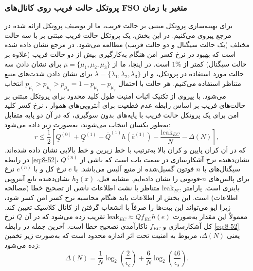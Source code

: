 \subsubsection{پروتکل حالت فریب روی کانال‌های FSO متغیر با زمان}
\label{subsec:8-3-2}
برای بهینه‌سازی پروتکل مبتنی بر حالت فریب، ما از توصیف پروتکل ارائه شده در مرجع \cite{8-49} پیروی می‌کنیم. در این بخش، یک پروتکل حالت فریب مبتنی بر  با سه حالت مختلف (یک حالت سیگنال و دو حالت فریب) مطالعه می‌شود. در مرجع \cite{8-50} نشان داده شده است که بهبود در نرخ کسر امن هنگام به‌کارگیری بیش از دو حالت فریب (علاوه بر حالت سیگنال) کمتر از $1\%$ است. در اینجا، ما از $\mu = \{\mu_1, \mu_2, \mu_3\}$ برای نشان دادن سه حالت مورد استفاده در پروتکل، و از $\lambda = \{\lambda_1, \lambda_2, \lambda_3\}$ برای نشان دادن شدت‌های منبع متناظر استفاده می‌کنیم. هر حالت با احتمال $p_{\mu_1} > p_{\mu_2} > p_{\mu_3} = 1 - p_{\mu_1} - p_{\mu_2}$ انتخاب می‌شود. با پیروی از تکنیک اثبات امنیت طول کلید محدود برای پروتکل مبتنی بر حالت‌های فریب بر اساس رابطه عدم قطعیت برای آنتروپی‌های هموار \cite{8-28, 8-29, 8-41, 8-51}، نرخ کسر کلید امن برای یک پروتکل حالت فریب با پایه‌های بدون سوگیری، که در آن دو پایه متقابل به‌طور یکسان انتخاب می‌شوند، به‌صورت زیر داده می‌شود:
\begin{equation}
	r \leq \frac{1}{2} \left[ \underline{Q}^{(0)} + \underline{Q}^{(1)} - \overline{Q}^{(1)} h(\bar{e}^{(1)}) - \frac{\text{leak}_{EC}}{N} - \Delta(N) \right],
	\label{eq:8-52}
\end{equation}
که در آن کران پایین و کران بالا به‌ترتیب با خط زیرین و خط بالایی نشان داده شده‌اند. در رابطه \eqref{eq:8-52}، $Q^{(n)}$ نشان‌دهنده نرخ آشکارسازی در سمت باب است که ناشی از سیگنال‌های با $n$ فوتون گسیل‌شده از منبع آلیس می‌باشد. با $e$ نرخ کل  و با $e^{(n)}$ نرخ  برای پالس‌های $n$-فوتونی را نشان داده‌ایم. مشابه قبل، $h_2(x)$ نشان‌دهنده تابع آنتروپی باینری است. پارامتر $\text{leak}_{EC}$ متناظر با نشت اطلاعات ناشی از تصحیح خطا (مصالحه اطلاعات) است. این بخش از اطلاعات باید هنگام محاسبه نرخ کسر امن کسر شود، زیرا ایو می‌تواند این بیت‌ها را صرفاً با انشعاب گرفتن از کانال کلاسیک تعیین کند. معمولاً این مقدار به‌صورت $\text{leak}_{EC} \approx Q f_{EC} h(e)$ تقریب زده می‌شود که در آن $Q$ نرخ کل آشکارسازی و $f_{EC}$ ناکارآمدی تصحیح خطا است. آخرین جمله در رابطه \eqref{eq:8-52} یعنی $\Delta(N)$، مربوط به امنیت تحت اثر اندازه محدود است که به‌صورت زیر تخمین زده می‌شود:
\begin{equation}
	\Delta(N) = \frac{1}{N} \log_2 \left( \frac{2}{\epsilon_c} \right) + \frac{6}{N} \log_2 \left( \frac{46}{\epsilon_s} \right).
	\label{eq:8-53}
\end{equation}
